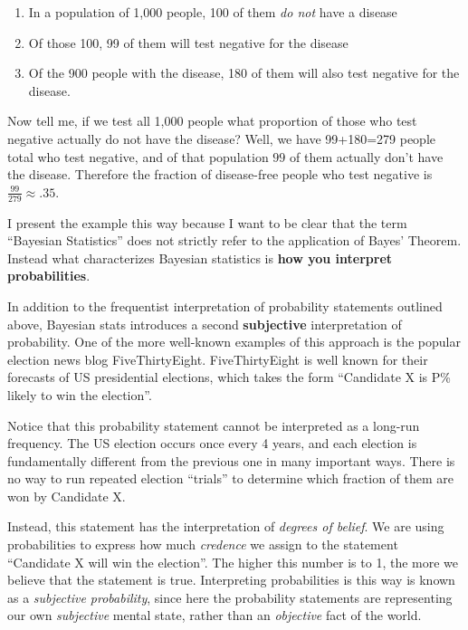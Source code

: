 \documentclass[
]{article}
\providecommand{\tightlist}{%
  \setlength{\itemsep}{0pt}\setlength{\parskip}{0pt}}
\begin{document}
\begin{enumerate}
\def\labelenumi{\arabic{enumi}.}
\tightlist
\item
  In a population of 1,000 people, 100 of them \emph{do not} have a
  disease
\item
  Of those 100, 99 of them will test negative for the disease
\item
  Of the 900 people with the disease, 180 of them will also test
  negative for the disease.
\end{enumerate}

Now tell me, if we test all 1,000 people what proportion of those who
test negative actually do not have the disease? Well, we have 99+180=279
people total who test negative, and of that population \(99\) of them
actually don't have the disease. Therefore the fraction of disease-free
people who test negative is \(\frac{99}{279} \approx .35\).

I present the example this way because I want to be clear that the term
``Bayesian Statistics'' does not strictly refer to the application of
Bayes' Theorem. Instead what characterizes Bayesian statistics is
\textbf{how you interpret probabilities}.

In addition to the frequentist interpretation of probability statements
outlined above, Bayesian stats introduces a second \textbf{subjective}
interpretation of probability. One of the more well-known examples of
this approach is the popular election news blog FiveThirtyEight.
FiveThirtyEight is well known for their forecasts of US presidential
elections, which takes the form ``Candidate X is P\% likely to win the
election''.

Notice that this probability statement cannot be interpreted as a
long-run frequency. The US election occurs once every 4 years, and each
election is fundamentally different from the previous one in many
important ways. There is no way to run repeated election ``trials'' to
determine which fraction of them are won by Candidate X.

Instead, this statement has the interpretation of \emph{degrees of
belief}. We are using probabilities to express how much \emph{credence}
we assign to the statement ``Candidate X will win the election''. The
higher this number is to 1, the more we believe that the statement is
true. Interpreting probabilities is this way is known as a
\emph{subjective probability}, since here the probability statements are
representing our own \emph{subjective} mental state, rather than an
\emph{objective} fact of the world.
\end{document}
